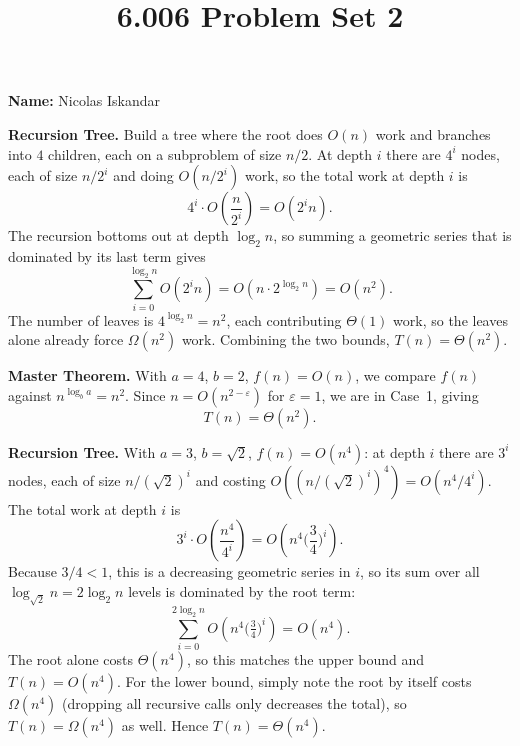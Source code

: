 \documentclass[12pt,twoside]{article}
\title{6.006 Problem Set 2}
\newcommand{\theproblemsetnum}{2}
\begin{document}
\handout{Problem Set \theproblemsetnum}{}
\setlength{\parindent}{0pt}
\medskip\hrulefill\medskip

{\bf Name:} Nicolas Iskandar

\medskip\hrulefill


\begin{problems}

\problem  %

\begin{problemparts}

\problempart

\textbf{Recursion Tree.}
Build a tree where the root does $O(n)$ work and branches into $4$ children, each on a subproblem
of size $n/2$. At depth $i$ there are $4^i$ nodes, each of size $n/2^i$ and doing $O(n/2^i)$ work,
so the total work at depth $i$ is
\[
  4^i \cdot O\!\left(\frac{n}{2^i}\right) = O(2^i n).
\]
The recursion bottoms out at depth $\log_2 n$, so summing a geometric series that is dominated by
its last term gives
\[
  \sum_{i=0}^{\log_2 n} O(2^i n) = O(n \cdot 2^{\log_2 n}) = O(n^2).
\]
The number of leaves is $4^{\log_2 n} = n^2$, each contributing $\Theta(1)$ work, so the leaves
alone already force $\Omega(n^2)$ work. Combining the two bounds, $T(n) = \Theta(n^2)$.

\textbf{Master Theorem.}
With $a=4$, $b=2$, $f(n) = O(n)$, we compare $f(n)$ against $n^{\log_b a} = n^2$.
Since $n = O(n^{2-\varepsilon})$ for $\varepsilon = 1$, we are in Case~1, giving
\[
  \boxed{T(n) = \Theta(n^2).}
\]

\problempart

\textbf{Recursion Tree.}
With $a = 3$, $b = \sqrt2$, $f(n) = O(n^4)$: at depth $i$ there are $3^i$ nodes, each of size
$n/(\sqrt2)^i$ and costing $O\!\left((n/(\sqrt2)^i)^4\right) = O(n^4/4^i)$. The total work at
depth $i$ is
\[
  3^i \cdot O\!\left(\frac{n^4}{4^i}\right) = O\!\left(n^4\Big(\frac{3}{4}\Big)^{i}\right).
\]
Because $3/4 < 1$, this is a decreasing geometric series in $i$, so its sum over all
$\log_{\sqrt2} n = 2\log_2 n$ levels is dominated by the root term:
\[
  \sum_{i=0}^{2\log_2 n} O\!\left(n^4\Big(\tfrac{3}{4}\Big)^i\right) = O(n^4).
\]
The root alone costs $\Theta(n^4)$, so this matches the upper bound and $T(n) = O(n^4)$.
For the lower bound, simply note the root by itself costs $\Omega(n^4)$ (dropping all recursive
calls only decreases the total), so $T(n) = \Omega(n^4)$ as well.
Hence $T(n) = \Theta(n^4)$.


\end{problemparts}
\end{problems}
\end{document}
